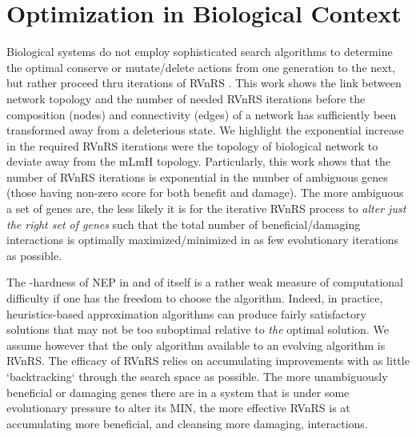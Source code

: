 \section{Optimization in Biological Context}\label{opt_in_bio_context}
    Biological systems do not employ sophisticated search algorithms to determine the optimal conserve or mutate/delete actions from one generation to the next, but rather proceed thru iterations of RVnRS \cite{carvunis_proto-genes_2012}. This work shows the link between network topology and the number of needed RVnRS iterations before the composition (nodes) and connectivity (edges) of a network has sufficiently been transformed away from a deleterious state. We highlight the exponential increase in the required RVnRS iterations were the topology of biological network to deviate away from the mLmH topology. 
    Particularly, this work shows that the number of RVnRS iterations is exponential in the number of ambiguous genes (those having non-zero score for both benefit and damage).
    The more ambiguous a set of genes are, the less likely it is for the iterative RVnRS process to \textit{alter just the right set of genes} such that the total number of beneficial/damaging interactions is optimally maximized/minimized in as few evolutionary iterations as possible. 

    The -hardness of NEP in and of itself is a rather weak measure of computational difficulty if one has the freedom to choose the algorithm. Indeed, in practice, heuristics-based approximation algorithms can produce fairly satisfactory solutions that may not be too suboptimal relative to \textit{the} optimal solution. We assume however that the only algorithm available to an evolving algorithm is RVnRS. 
    The efficacy of RVnRS relies on accumulating improvements with as little `backtracking` through the search space as possible. The more unambiguously beneficial or damaging genes there are in a system that is under some evolutionary pressure to alter its MIN, the more effective RVnRS is at accumulating more beneficial, and cleansing more damaging, interactions.

